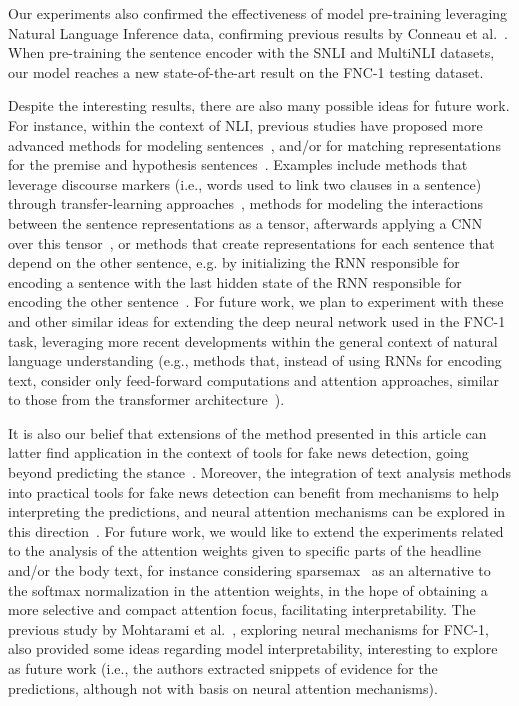 Our experiments also confirmed the effectiveness of model pre-training leveraging Natural Language Inference data, confirming previous results by Conneau et al.~\cite{supervised}. When pre-training the sentence encoder with the SNLI and MultiNLI datasets, our model reaches a new state-of-the-art result on the FNC-1 testing dataset.

Despite the interesting results, there are also many possible ideas for future work. For instance, within the context of NLI, previous studies have proposed more advanced methods for modeling sentences~\cite{choi2018cell,dr-bilstm,tay2017compare,tay2017costack}, and/or for matching representations for the premise and hypothesis sentences~\cite{gong2017natural,dr-bilstm,tay2017costack}. Examples include methods that leverage discourse markers (i.e., words used to link two clauses in a sentence) through transfer-learning approaches~\cite{dman}, methods for modeling the interactions between the sentence representations as a tensor, afterwards applying a CNN over this tensor~\cite{gong2017natural}, or methods that create representations for each sentence that depend on the other sentence, e.g. by initializing the RNN responsible for encoding a sentence with the last hidden state of the RNN responsible for encoding the other sentence~\cite{dr-bilstm,tay2017compare,tay2017costack}. For future work, we plan to experiment with these and other similar ideas for extending the deep neural network used in the FNC-1 task, leveraging more recent developments within the general context of natural language understanding (e.g., methods that, instead of using RNNs for encoding text, consider only feed-forward computations and attention approaches, similar to those from the transformer architecture~\cite{transformer,cer2018universal,Dehghani2018}).

It is also our belief that extensions of the method presented in this article can latter find application in the context of tools for fake news detection, going beyond predicting the stance~\cite{perez2017automatic,DeClarE2018,konstantinovskiy2018towards}. Moreover, the integration of text analysis methods into practical tools for fake news detection can benefit from mechanisms to help interpreting the predictions, and neural attention mechanisms can be explored in this direction~\cite{hierarchical}. For future work, we would like to extend the experiments related to the analysis of the attention weights given to specific parts of the headline and/or the body text, for instance considering sparsemax~\cite{martins2016softmax} as an alternative to the softmax normalization in the attention weights, in the hope of obtaining a more selective and compact attention focus, facilitating interpretability. The previous study by Mohtarami et al.~\cite{Mohtarami2018}, exploring neural mechanisms for FNC-1, also provided some ideas regarding model interpretability, interesting to explore as future work (i.e., the authors extracted snippets of evidence for the predictions, although not with basis on neural attention mechanisms).

